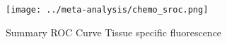 \begin{figure}[p]
\centering

\texttt{[image: ../meta-analysis/chemo\_sroc.png]}

\caption[Summary ROC Curve Chemiluminescence]{Summary ROC Curve Tissue specific fluorescence}
\label{fig:chemo_sroc}
\end{figure}
